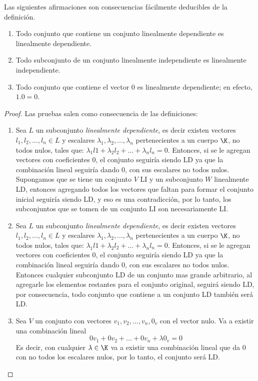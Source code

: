 \documentclass[a4,10pt]{aleph-notas}
\begin{document}
\begin{obs}
    Las siguientes afirmaciones son consecuencias fácilmente deducibles  de la definición.
    \begin{enumerate}
        \item Todo conjunto que contiene un conjunto linealmente dependiente es linealmente dependiente.
        \item  Todo subconjunto de un conjunto linealmente independiente es linealmente independiente.
        \item  Todo conjunto que contiene el vector $0$ es linealmente dependiente; en efecto, $1.0 = 0$.
    \end{enumerate}
\end{obs}
\begin{proof} 
    Las pruebas salen como consecuencia de las definiciones:
    \noindent \begin{enumerate}
        \item Sea $L$ un subconjunto \textit{linealmente dependiente}, es decir existen vectores $l_1,l_2,...,l_n\in L$ y escalares $\lambda_1,\lambda_2,...,\lambda_n$ pertenecientes a un cuerpo $\K$, no todos nulos, tales que: $\lambda_1l1+\lambda_2l_2+...+\lambda_nl_n=0$. Entonces, si se le agregan vectores con coeficientes 0, el conjunto seguiría siendo LD ya que la combinación lineal seguiría dando 0, con sus escalares no todos nulos. \\
        Supongamos que se tiene un conjunto $V$ LI y un subconjunto $W$ linealmente LD, entonces agregando todos los vectores que faltan para formar el conjunto inicial seguiría siendo LD, y eso es una contradicción, por lo tanto, los subconjuntos que se tomen de un conjunto LI son necesariamente LI.
        \item Sea $L$ un subconjunto \textit{linealmente dependiente}, es decir existen vectores $l_1,l_2,...,l_n\in L$ y escalares $\lambda_1,\lambda_2,...,\lambda_n$ pertenecientes a un cuerpo $\K$, no todos nulos, tales que: $\lambda_1l1+\lambda_2l_2+...+\lambda_nl_n=0$. Entonces, si se le agregan vectores con coeficientes 0, el conjunto seguiría siendo LD ya que la combinación lineal seguiría dando 0, con sus escalares no todos nulos. \\
        Entonces cualquier subconjunto LD de un conjunto mas grande arbitrario, al agregarle los elementos restantes para el conjunto original, seguirá siendo LD, por consecuencia, todo conjunto que contiene a un conjunto LD también será LD.
        \item Sea $V$ un conjunto con vectores $v_1,v_2,...,v_n,0_v$ con el vector nulo. Va a existir una combinación lineal 
        $$
        0v_1+0v_2+...+0v_n+\lambda0_v=0
        $$
        Es decir, con cualquier $\lambda\in\K$ va a existir una combinación lineal que da 0 con no todos los escalares nulos, por lo tanto, el conjunto será LD.
    \end{enumerate}
\end{proof}
\end{document}

